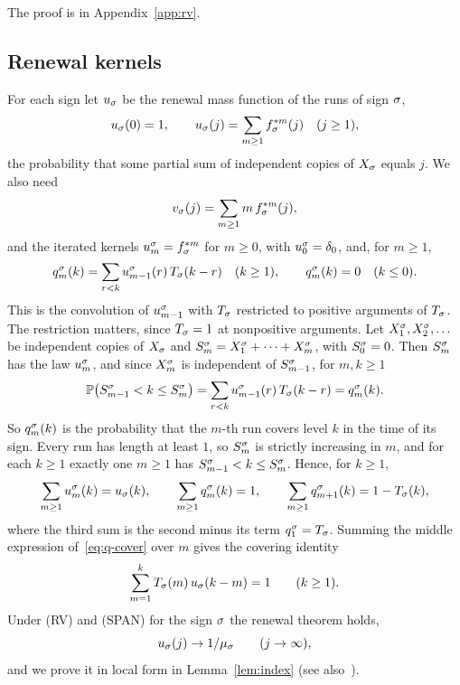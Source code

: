 The proof is in Appendix~\ref{app:rv}.

\subsection{Renewal kernels}\label{sec:kernels}

For each sign let $u_\sigma$ be the renewal mass function of the runs of sign $\sigma$,
\[
 u_\sigma(0)=1,\qquad u_\sigma(j)=\sum_{m\ge1}f_\sigma^{*m}(j)\quad(j\ge1),
\]
the probability that some partial sum of independent copies of $X_\sigma$ equals
$j$. We also need
\[
 v_\sigma(j)=\sum_{m\ge1}m\,f_\sigma^{*m}(j),
\]
and the iterated kernels $u^\sigma_m=f_\sigma^{*m}$ for $m\ge0$, with
$u^\sigma_0=\delta_0$, and, for $m\ge1$,
\[
 q^\sigma_m(k)=\sum_{r<k}u^\sigma_{m-1}(r)\,T_\sigma(k-r)\quad(k\ge1),\qquad q^\sigma_m(k)=0\quad(k\le0).
\]
This is the convolution of $u^\sigma_{m-1}$ with $T_\sigma$ restricted to positive
arguments of $T_\sigma$. The restriction matters, since $T_\sigma=1$ at nonpositive
arguments. Let $X^\sigma_1,X^\sigma_2,\dots$ be independent
copies of $X_\sigma$ and $S^\sigma_m=X^\sigma_1+\dots+X^\sigma_m$, with $S^\sigma_0=0$. Then
$S^\sigma_m$ has the law $u^\sigma_m$, and since $X^\sigma_m$ is independent of
$S^\sigma_{m-1}$, for $m,k\ge1$
\begin{equation}\label{eq:q-cover}
 \mathbb{P}\bigl(S^\sigma_{m-1}<k\le S^\sigma_m\bigr)=\sum_{r<k}u^\sigma_{m-1}(r)\,T_\sigma(k-r)=q^\sigma_m(k).
\end{equation}
So $q^\sigma_m(k)$ is the probability that the $m$-th run covers level $k$ in the time
of its sign. Every run has length at least $1$, so $S^\sigma_m$ is strictly increasing
in $m$, and for each $k\ge1$ exactly one $m\ge1$ has $S^\sigma_{m-1}<k\le S^\sigma_m$.
Hence, for $k\ge1$,
\begin{equation}\label{eq:kernel-sums}
 \sum_{m\ge1}u^\sigma_m(k)=u_\sigma(k),\qquad
 \sum_{m\ge1}q^\sigma_m(k)=1,\qquad
 \sum_{m\ge1}q^\sigma_{m+1}(k)=1-T_\sigma(k),
\end{equation}
where the third sum is the second minus its term $q^\sigma_1=T_\sigma$. Summing the
middle expression of~\eqref{eq:q-cover} over $m$ gives the covering identity
\begin{equation}\label{eq:cover}
 \sum_{m=1}^{k}T_\sigma(m)\,u_\sigma(k-m)=1\qquad(k\ge1).
\end{equation}
Under (RV) and (SPAN) for the sign $\sigma$ the renewal theorem holds,
\begin{equation}\label{eq:renewal-thm}
 u_\sigma(j)\to1/\mu_\sigma\qquad(j\to\infty),
\end{equation}
and we prove it in local form in Lemma~\ref{lem:index} (see
also~\cite[Section~XIII.3]{feller1968}).

